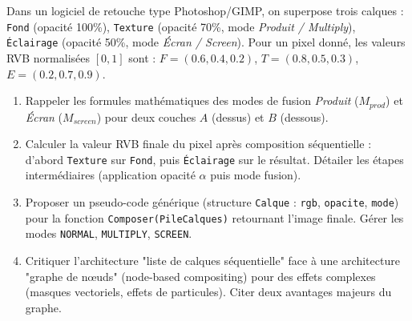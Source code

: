 \documentclass[11pt]{article}
\begin{document}
\begin{exercice}
Dans un logiciel de retouche type Photoshop/GIMP, on superpose trois calques : \texttt{Fond} (opacité 100\%), \texttt{Texture} (opacité 70\%, mode \textit{Produit / Multiply}), \texttt{Éclairage} (opacité 50\%, mode \textit{Écran / Screen}). Pour un pixel donné, les valeurs RVB normalisées $[0,1]$ sont : $F=(0.6, 0.4, 0.2)$, $T=(0.8, 0.5, 0.3)$, $E=(0.2, 0.7, 0.9)$.
\begin{enumerate}
    \item Rappeler les formules mathématiques des modes de fusion \textit{Produit} ($M_{prod}$) et \textit{Écran} ($M_{screen}$) pour deux couches $A$ (dessus) et $B$ (dessous).
    \item Calculer la valeur RVB finale du pixel après composition séquentielle : d'abord \texttt{Texture} sur \texttt{Fond}, puis \texttt{Éclairage} sur le résultat. Détailer les étapes intermédiaires (application opacité $\alpha$ puis mode fusion).
    \item Proposer un pseudo-code générique (structure \texttt{Calque} : \texttt{rgb}, \texttt{opacite}, \texttt{mode}) pour la fonction \texttt{Composer(PileCalques)} retournant l'image finale. Gérer les modes \texttt{NORMAL}, \texttt{MULTIPLY}, \texttt{SCREEN}.
    \item Critiquer l'architecture "liste de calques séquentielle" face à une architecture "graphe de nœuds" (node-based compositing) pour des effets complexes (masques vectoriels, effets de particules). Citer deux avantages majeurs du graphe.
\end{enumerate}
\end{exercice}
\end{document}
